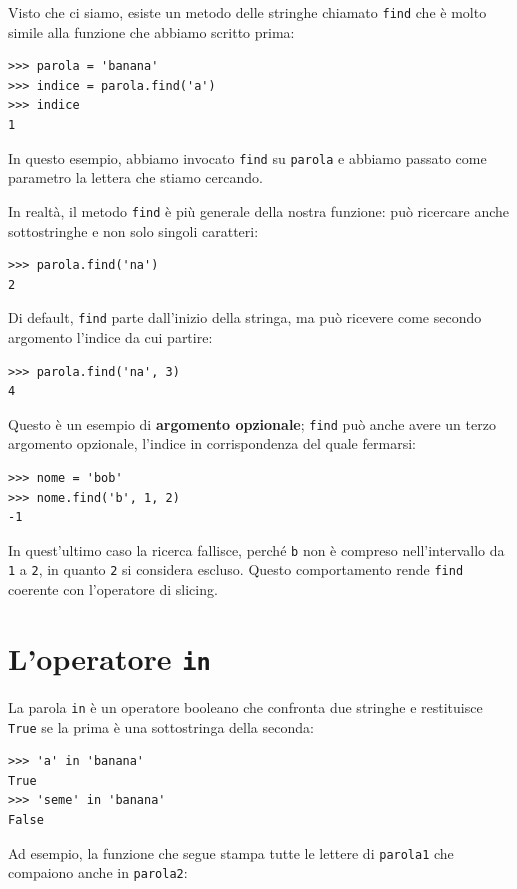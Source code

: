 \documentclass[10pt]{book}
\begin{document}
Visto che ci siamo, esiste un metodo delle stringhe chiamato {\tt find} che è molto simile alla funzione che abbiamo scritto prima:

\begin{verbatim}
>>> parola = 'banana'
>>> indice = parola.find('a')
>>> indice
1
\end{verbatim}
%
In questo esempio, abbiamo invocato {\tt find} su {\tt parola} e abbiamo passato come parametro la lettera che stiamo cercando.

In realtà, il metodo {\tt find} è più generale della nostra funzione: può ricercare anche sottostringhe e non solo singoli caratteri:

\begin{verbatim}
>>> parola.find('na')
2
\end{verbatim}
%
Di default, {\tt find} parte dall'inizio della stringa, ma può ricevere come secondo argomento l'indice da cui partire:

\begin{verbatim}
>>> parola.find('na', 3)
4
\end{verbatim}
%
Questo è un esempio di {\bf argomento opzionale}; {\tt find} può anche avere un terzo argomento opzionale, l'indice in corrispondenza del quale fermarsi:

\begin{verbatim}
>>> nome = 'bob'
>>> nome.find('b', 1, 2)
-1
\end{verbatim}
%
In quest'ultimo caso la ricerca fallisce, perché {\tt b} non è compreso nell'intervallo da {\tt 1} a {\tt 2}, in quanto {\tt 2} si considera escluso. Questo comportamento rende {\tt find} coerente con l'operatore di slicing.


\section{L'operatore {\tt in}}
\label{inboth}

La parola {\tt in} è un operatore booleano che confronta due stringhe e restituisce {\tt True} se la prima è una sottostringa della seconda:

\begin{verbatim}
>>> 'a' in 'banana'
True
>>> 'seme' in 'banana'
False
\end{verbatim}
%
Ad esempio, la funzione che segue stampa tutte le lettere di {\tt parola1} che compaiono anche in {\tt parola2}:
\end{document}
